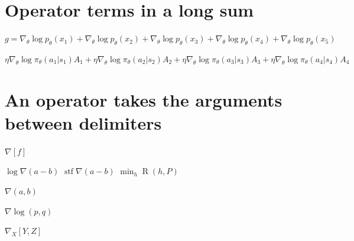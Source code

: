 \documentclass{article}
\begin{document}
\section{Operator terms in a long sum}
$g=\nabla_\theta\log p_\theta(x_1)+\nabla_\theta\log p_\theta(x_2)+\nabla_\theta\log p_\theta(x_3)+\nabla_\theta\log p_\theta(x_4)+\nabla_\theta\log p_\theta(x_5)$

$\eta\nabla_\theta\log\pi_\theta(a_1|s_1)A_1+\eta\nabla_\theta\log\pi_\theta(a_2|s_2)A_2+\eta\nabla_\theta\log\pi_\theta(a_3|s_3)A_3+\eta\nabla_\theta\log\pi_\theta(a_4|s_4)A_4$

\section{An operator takes the arguments between delimiters}
$\nabla[f]$

$\log\nabla(a-b)$ $\operatorname{stf}\nabla(a-b)$ $\min_{h}\operatorname*{R}(h,P)$

$\nabla(a,b)$

$\nabla\log(p,q)$

$\nabla_X[Y,Z]$
\end{document}
